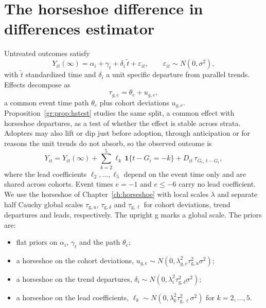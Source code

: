 \section{The horseshoe difference in differences estimator}

Untreated outcomes satisfy
\begin{equation}
Y_{it}(\infty) = \alpha_i + \gamma_t + \delta_i\,\tilde t + \varepsilon_{it}, \qquad \varepsilon_{it} \sim N(0, \sigma^2),
\label{eq:hsdid0}
\end{equation}
with $\tilde t$ standardized time and $\delta_i$ a unit specific departure from parallel trends. Effects decompose as
\begin{equation}
\tau_{g,e} = \theta_e + u_{g,e},
\label{eq:hsdid1}
\end{equation}
a common event time path $\theta_e$ plus cohort deviations $u_{g,e}$. Proposition~\ref{gr:prop:hstest} studies the same split, a common effect with horseshoe departures, as a test of whether the effect is stable across strata. Adopters may also lift or dip just before adoption, through anticipation or for reasons the unit trends do not absorb, so the observed outcome is
\begin{equation}
Y_{it} = Y_{it}(\infty) + \sum_{k=2}^{5}\ell_k\,\mathbf 1\{t - G_i = -k\} + D_{it}\,\tau_{G_i,\,t - G_i},
\label{eq:hsdid2}
\end{equation}
where the lead coefficients $\ell_2, \ldots, \ell_5$ depend on the event time only and are shared across cohorts. Event times $e = -1$ and $e \le -6$ carry no lead coefficient. We use the horseshoe of Chapter~\ref{ch:horseshoe} with local scales $\lambda$ and separate half Cauchy global scales $\tau_{\mathrm{g},u}$, $\tau_{\mathrm{g},\delta}$ and $\tau_{\mathrm{g},\ell}$ for cohort deviations, trend departures and leads, respectively. The upright g marks a global scale. The priors are:
\begin{itemize}
\item flat priors on $\alpha_i$, $\gamma_t$ and the path $\theta_e$;
\item a horseshoe on the cohort deviations, $u_{g,e} \sim N(0, \lambda_{g,e}^2\tau_{\mathrm{g},u}^2\sigma^2)$;
\item a horseshoe on the trend departures, $\delta_i \sim N(0, \lambda_i^2\tau_{\mathrm{g},\delta}^2\sigma^2)$;
\item a horseshoe on the lead coefficients, $\ell_k \sim N(0, \lambda_k^2\tau_{\mathrm{g},\ell}^2\sigma^2)$ for $k = 2, \ldots, 5$.
\end{itemize}

